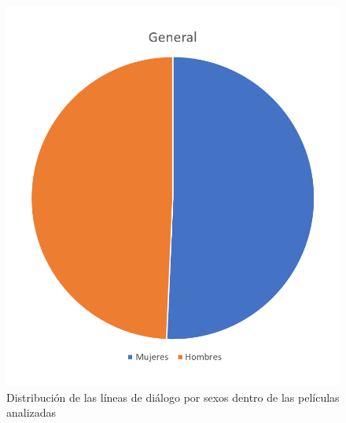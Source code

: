     \begin{figure}
        \centering
        \includegraphics[scale=0.7]{Images/general.png}
        \caption{Distribución de las líneas de diálogo por sexos dentro de las películas analizadas}
    \end{figure}